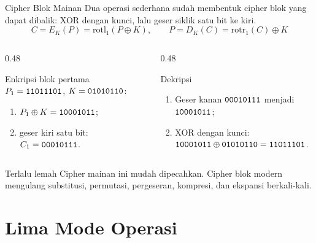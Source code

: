 \documentclass[aspectratio=169,11pt]{beamer}
\begin{document}
\begin{frame}{Cipher Blok Mainan}
    \footnotesize
    Dua operasi sederhana sudah membentuk cipher blok yang dapat dibalik:
    XOR dengan kunci, lalu geser siklik satu bit ke kiri.
    \[
        C = E_K(P) = \mathrm{rotl}_1(P \oplus K), \qquad
        P = D_K(C) = \mathrm{rotr}_1(C) \oplus K
    \]
    \begin{columns}[T,onlytextwidth]
        \begin{column}{0.48\textwidth}
            \begin{exampleblock}{Enkripsi blok pertama}
                \footnotesize
                $P_1=\texttt{11011101}$, $K=\texttt{01010110}$:
                \begin{enumerate}
                    \item $P_1 \oplus K = \texttt{10001011}$;
                    \item geser kiri satu bit: $C_1=\texttt{00010111}$.
                \end{enumerate}
            \end{exampleblock}
        \end{column}
        \begin{column}{0.48\textwidth}
            \begin{exampleblock}{Dekripsi}
                \footnotesize
                \begin{enumerate}
                    \item Geser kanan $\texttt{00010111}$ menjadi
                          $\texttt{10001011}$;
                    \item XOR dengan kunci:
                          $\texttt{10001011}\oplus\texttt{01010110}
                          =\texttt{11011101}$.
                \end{enumerate}
            \end{exampleblock}
        \end{column}
    \end{columns}
    \vspace{0.1cm}
    \begin{alertblock}{Terlalu lemah}
        \footnotesize
        Cipher mainan ini mudah dipecahkan. Cipher blok modern mengulang
        substitusi, permutasi, pergeseran, kompresi, dan ekspansi berkali-kali.
    \end{alertblock}
\end{frame}

\section{Lima Mode Operasi}
\end{document}

